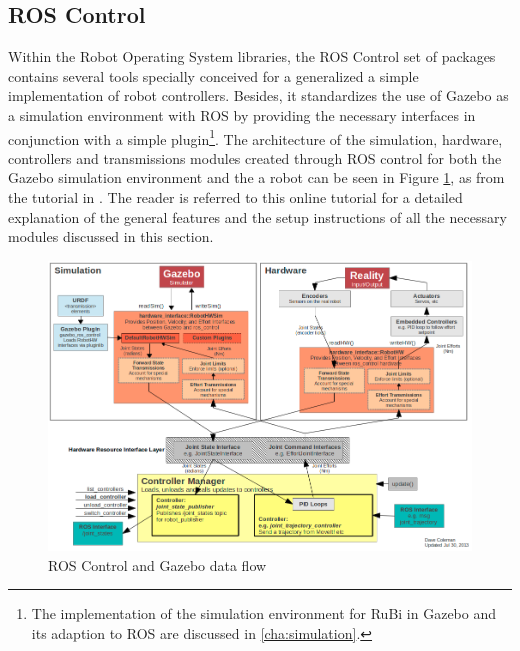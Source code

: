 
\subsection{ROS Control} %
\label{sub:ros_control}
Within the Robot Operating System libraries, the ROS Control set of packages \cite{ros_control} contains several tools specially conceived for a generalized a simple implementation of robot controllers.
Besides, it standardizes the use of Gazebo \cite{gazebo} as a simulation environment with ROS by providing the necessary interfaces in conjunction with a simple plugin\footnote{The implementation of the simulation environment for RuBi in Gazebo and its adaption to ROS are discussed in \ref{cha:simulation}.}.
The architecture of the simulation, hardware, controllers and transmissions modules created through ROS control for both the Gazebo simulation environment and the a robot can be seen in Figure \ref{fig:ros_control_gazebo}, as from the tutorial in \cite{ros_control_tutorial}. The reader is referred to this online tutorial for a detailed explanation of the general features and the setup instructions of all the necessary modules discussed in this section.

\begin{figure}[ht]
	\centering
	\includegraphics[width=\textwidth]{figures/ros_control_gazebo.png} 
	\caption{ROS Control and Gazebo data flow}
	\label{fig:ros_control_gazebo}
\end{figure}

